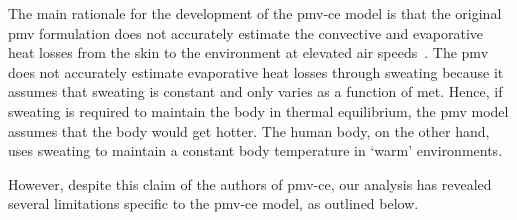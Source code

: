 The main rationale for the development of the \ac{pmv-ce} model is that the original \ac{pmv} formulation does not accurately estimate the convective and evaporative heat losses from the skin to the environment at elevated air speeds~\cite{huang_applicability_2014}.
The \ac{pmv} does not accurately estimate evaporative heat losses through sweating because it assumes that sweating is constant and only varies as a function of \ac{met}.
Hence, if sweating is required to maintain the body in thermal equilibrium, the \ac{pmv} model assumes that the body would get hotter.
The human body, on the other hand, uses sweating to maintain a constant body temperature in `warm' environments.

However, despite this claim of the authors of \ac{pmv-ce}, our analysis has revealed several limitations specific to the \ac{pmv-ce} model, as outlined below.

